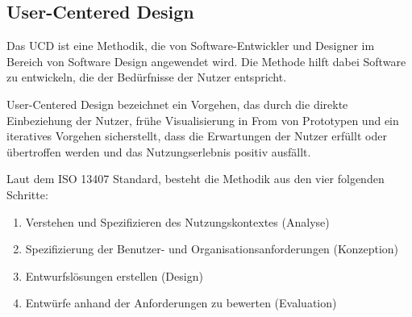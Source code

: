 \subsection{User-Centered Design}

Das \ac{UCD} ist eine Methodik, die von Software-Entwickler und Designer im Bereich von Software Design angewendet wird. 
Die Methode hilft dabei Software zu entwickeln, die der Bedürfnisse der Nutzer entspricht. \cite[vgl.]{salinas_2020}

\begin{definition}

User-Centered Design bezeichnet ein Vorgehen, das durch die direkte Einbeziehung der Nutzer, frühe Visualisierung in From von Prototypen und ein iteratives Vorgehen sicherstellt, dass die Erwartungen der Nutzer erfüllt oder übertroffen werden und das Nutzungserlebnis positiv ausfällt. \citet{weichert_quick_2021}

\end{definition} 

Laut dem ISO 13407 Standard, besteht die Methodik aus den vier folgenden Schritte:

\begin{enumerate}
	\item Verstehen und Spezifizieren des Nutzungskontextes (Analyse)
	\item Spezifizierung der Benutzer- und Organisationsanforderungen (Konzeption)
	\item Entwurfslösungen erstellen (Design)
	\item Entwürfe anhand der Anforderungen zu bewerten (Evaluation)
\end{enumerate}
